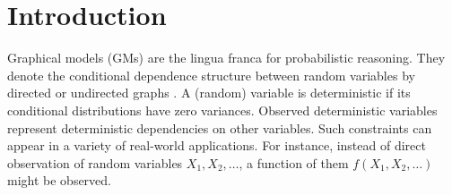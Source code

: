 \documentclass{article}
\begin{document}
\section{Introduction}
\label{sect:intro}
Graphical models (GMs) are the lingua franca for probabilistic reasoning.
They denote the conditional dependence structure between random variables by directed or undirected graphs \cite{koller2009probabilistic}. A (random) variable is deterministic if its conditional distributions have zero variances. 
Observed deterministic variables represent deterministic dependencies on other variables.
Such constraints can appear in a variety of real-world applications.
For instance, instead of direct observation of random variables 
$X_1, X_2, \ldots$, a function of them $f(X_1, X_2, \ldots)$ might be observed. 
\end{document}
